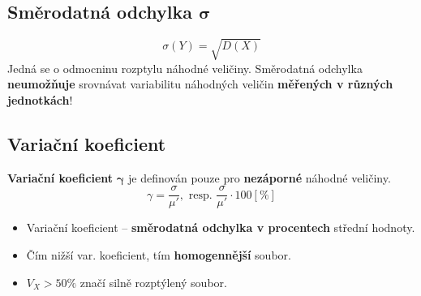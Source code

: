 \subsection{Směrodatná odchylka $\mathbf{\sigma}$}
$$\sigma(Y) = \sqrt{D(X)}$$
Jedná se o odmocninu rozptylu náhodné veličiny. Směrodatná odchylka \textbf{neumožňuje} srovnávat variabilitu náhodných veličin \textbf{měřených v různých jednotkách}!

\subsection{Variační koeficient}
\textbf{Variační koeficient} $\mathbf{\gamma}$ je definován pouze pro \textbf{nezáporné} náhodné veličiny. $$\gamma = \frac{\sigma}{\mu'}, \textrm{ resp. } \frac{\sigma}{\mu'} \cdot 100 [\%]$$
\begin{itemize}
    \item Variační koeficient -- \textbf{směrodatná odchylka v procentech} střední hodnoty.
    \item Čím nižší var. koeficient, tím \textbf{homogennější} soubor.
    \item $V_X > 50\%$ značí silně rozptýlený soubor.
\end{itemize}
